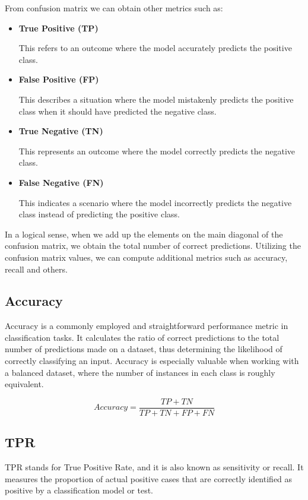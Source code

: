 From confusion matrix we can obtain other metrics such as:

\begin{itemize}
  \item \textbf{True Positive (TP)}

    This refers to an outcome where the model accurately predicts the positive class.
  \item \textbf{False Positive (FP)}

    This describes a situation where the model mistakenly predicts the positive class when it should have predicted the negative class.
  \item \textbf{True Negative (TN)}

    This represents an outcome where the model correctly predicts the negative class.
  \item \textbf{False Negative (FN)}

    This indicates a scenario where the model incorrectly predicts the negative class instead of predicting the positive class.

\end{itemize}


In a logical sense, when we add up the elements on the main diagonal of the
confusion matrix, we obtain the total number of correct predictions.
Utilizing the confusion matrix values, we can compute
additional metrics such as accuracy, recall and others.

\subsection{Accuracy}

Accuracy is a commonly employed and straightforward performance metric in
classification tasks. It calculates the ratio of correct predictions to the
total number of predictions made on a dataset, thus determining the likelihood
of correctly classifying an input. Accuracy is especially valuable when working
with a balanced dataset, where the number of instances in each class is roughly
equivalent.

\[Accuracy = \frac{TP + TN}{TP + TN + FP + FN}\]

\subsection{TPR}

TPR stands for True Positive Rate, and it is also known as sensitivity or
recall. It measures the proportion of actual positive cases that are correctly
identified as positive by a classification model or test.

